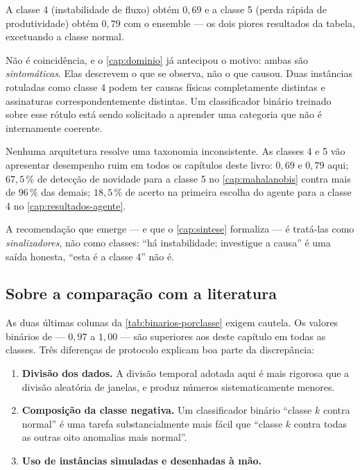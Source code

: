 A classe 4 (instabilidade de fluxo) obtém $0{,}69$ e a classe 5 (perda rápida de
produtividade) obtém $0{,}79$ com o ensemble --- os dois piores resultados da tabela,
excetuando a classe normal.

Não é coincidência, e o \cref{cap:dominio} já antecipou o motivo: ambas são
\emph{sintomáticas}. Elas descrevem o que se observa, não o que causou. Duas instâncias
rotuladas como classe 4 podem ter causas físicas completamente distintas e assinaturas
correspondentemente distintas. Um classificador binário treinado sobre esse rótulo está
sendo solicitado a aprender uma categoria que não é internamente coerente.

\begin{destaque}
Nenhuma arquitetura resolve uma taxonomia inconsistente. As classes 4 e 5 vão
apresentar desempenho ruim em todos os capítulos deste livro: $0{,}69$ e $0{,}79$ aqui;
$67{,}5\,\%$ de detecção de novidade para a classe 5 no \cref{cap:mahalanobis} contra
mais de $96\,\%$ das demais; $18{,}5\,\%$ de acerto na primeira escolha do agente para a
classe 4 no \cref{cap:resultados-agente}.

A recomendação que emerge --- e que o \cref{cap:sintese} formaliza --- é tratá-las como
\emph{sinalizadores}, não como classes: ``há instabilidade; investigue a causa'' é uma
saída honesta, ``esta é a classe 4'' não é.
\end{destaque}

\subsection{Sobre a comparação com a literatura}

As duas últimas colunas da \cref{tab:binarios-porclasse} exigem cautela. Os valores
binários de \citet{Marins2021} --- $0{,}97$ a $1{,}00$ --- são superiores aos deste
capítulo em todas as classes. Três diferenças de protocolo explicam boa parte da
discrepância:

\begin{enumerate}[leftmargin=*,itemsep=0.3em]
  \item \textbf{Divisão dos dados.} A divisão temporal adotada aqui é mais rigorosa que
        a divisão aleatória de janelas, e produz números sistematicamente menores.
  \item \textbf{Composição da classe negativa.} Um classificador binário
        ``classe $k$ contra normal'' é uma tarefa substancialmente mais fácil que
        ``classe $k$ contra todas as outras oito anomalias mais normal''.
  \item \textbf{Uso de instâncias simuladas e desenhadas à mão.}
\end{enumerate}

